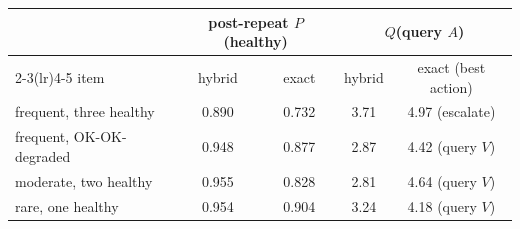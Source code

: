 \begin{center}\small
\begin{tabular}{lcccc}
\toprule
& \multicolumn{2}{c}{post-repeat $P$(healthy)} & \multicolumn{2}{c}{$Q$(query $A$)}\\
\cmidrule(lr){2-3}\cmidrule(lr){4-5}
item & hybrid & exact & hybrid & exact (best action)\\
\midrule
frequent, three healthy & 0.890 & 0.732 & 3.71 & 4.97 (escalate)\\
frequent, OK-OK-degraded & 0.948 & 0.877 & 2.87 & 4.42 (query $V$)\\
moderate, two healthy & 0.955 & 0.828 & 2.81 & 4.64 (query $V$)\\
rare, one healthy & 0.954 & 0.904 & 3.24 & 4.18 (query $V$)\\
\bottomrule
\end{tabular}
\end{center}
